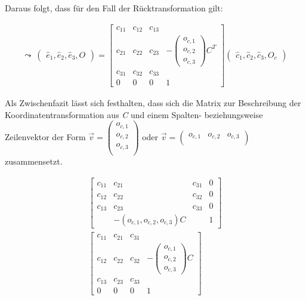 	Daraus folgt, dass für den Fall der Rücktransformation gilt:
	
	\begin{gather}
	\leadsto \: \begin{pmatrix}
	\hat{e}_1,\hat{e}_2,\hat{e}_3,O
	\end{pmatrix} = 
	\begin{bmatrix}
	c_{11} & c_{12} & c_{13} & \\
	c_{21} & c_{22} & c_{23} &  -\begin{pmatrix}
	o_{c,1}\\
	o_{c,2}\\
	o_{c,3}
	\end{pmatrix}C^T\\
	c_{31} & c_{32} & c_{33} & \\
	0&0&0 & 1
	\end{bmatrix}
	\begin{pmatrix}
	\hat{c}_1,\hat{c}_2,\hat{c}_3,O_c
	\end{pmatrix}
	\end{gather}
	
 Als Zwischenfazit lässt sich festhalten, dass sich die Matrix zur Beschreibung der Koordinatentransformation aus \textit{C} und einem Spalten- beziehungsweise Zeilenvektor der Form  \ensuremath{\vec{v}=\begin{pmatrix}
		o_{c,1}\\o_{c,2}\\o_{c,3}\\
	\end{pmatrix}} oder \ensuremath{\vec{v}=\begin{pmatrix}
	o_{c,1}&o_{c,2}&o_{c,3}\\
\end{pmatrix}} zusammensetzt.

\begin{gather}
		\begin{bmatrix}
	c_{11} & c_{21} & c_{31} & 0\\
	c_{12} & c_{22} & c_{32} & 0\\
	c_{13} & c_{23} & c_{33} & 0\\
	&-(o_{c,1}, o_{c,2}, o_{c,3})C& & 1
	\end{bmatrix}\\
		\begin{bmatrix}
	c_{11} & c_{21} & c_{31} & \\
	c_{12} & c_{22} & c_{32} & -\begin{pmatrix}
	o_{c,1}\\o_{c,2}\\ o_{c,3}
	\end{pmatrix}C\\
	c_{13} & c_{23} & c_{33} &\\
	0&0&0&1
	\end{bmatrix}
\end{gather}\\

